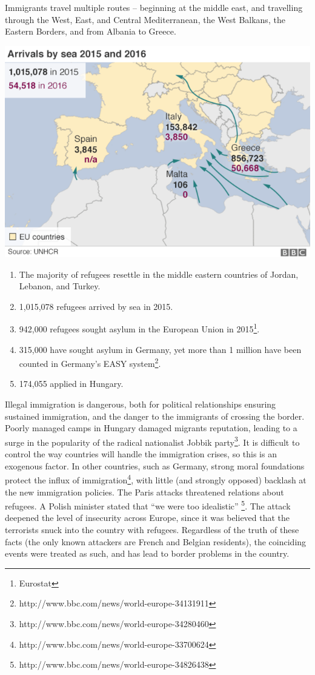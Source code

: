 \documentclass{article}
\begin{document}
Immigrants travel multiple routes -- beginning at the middle east, and travelling through the West, East, and Central Mediterranean, the West Balkans, the Eastern Borders, and from Albania to Greece.

\begin{center}
\includegraphics[scale=0.5]{travelmap}
\end{center}

\begin{enumerate}
    \item The majority of refugees resettle in the middle eastern countries of Jordan, Lebanon, and Turkey.
    \item 1,015,078 refugees arrived by sea in 2015.
    \item 942,000 refugees sought asylum in the European Union in 2015\footnote{Eurostat}.
    \item 315,000 have sought asylum in Germany, yet more than 1 million have been counted in Germany's EASY system\footnote{http://www.bbc.com/news/world-europe-34131911}.
    \item 174,055 applied in Hungary.
\end{enumerate}

Illegal immigration is dangerous, both for political relationships ensuring sustained immigration, and the danger to the immigrants of crossing the border. Poorly managed camps in Hungary damaged migrants reputation, leading to a surge in the popularity of the radical nationalist Jobbik party\footnote{http://www.bbc.com/news/world-europe-34280460}. It is difficult to control the way countries will handle the immigration crises, so this is an exogenous factor. In other countries, such as Germany, strong moral foundations protect the influx of immigration\footnote{http://www.bbc.com/news/world-europe-33700624}, with little (and strongly opposed) backlash at the new immigration policies. The Paris attacks threatened relations about refugees. A Polish minister stated that ``we were too idealistic'' \footnote{http://www.bbc.com/news/world-europe-34826438}. The attack deepened the level of insecurity across Europe, since it was believed that the terrorists snuck into the country with refugees. Regardless of the truth of these facts (the only known attackers are French and Belgian residents), the coinciding events were treated as such, and has lead to border problems in the country.
\end{document}

